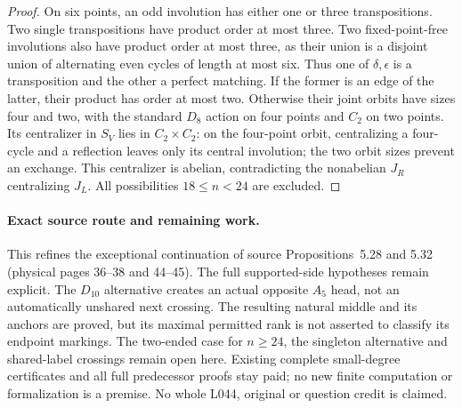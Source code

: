 \documentclass[11pt,a4paper]{article}
\begin{document}
\begin{proof}
On six points, an odd involution has either one or three
transpositions. Two single transpositions have product order at
most three. Two fixed-point-free involutions also have product
order at most three, as their union is a disjoint union of
alternating even cycles of length at most six.
Thus one of $\delta,\epsilon$ is a transposition and the other
a perfect matching. If the former is an edge of the latter,
their product has order at most two. Otherwise their joint orbits
have sizes four and two, with the standard $D_8$ action on four
points and $C_2$ on two points. Its centralizer in $S_V$ lies in
$C_2\times C_2$: on the four-point orbit, centralizing a
four-cycle and a reflection leaves only its central involution;
the two orbit sizes prevent an exchange. This centralizer is
abelian, contradicting the nonabelian $J_R$ centralizing $J_L$.
All possibilities $18\le n<24$ are excluded.
\end{proof}

\paragraph{Exact source route and remaining work.}
This refines the exceptional continuation of source
Propositions~5.28 and 5.32 (physical pages 36--38 and 44--45).
The full supported-side hypotheses remain explicit.
The $D_{10}$ alternative creates an actual opposite $A_5$ head,
not an automatically unshared next crossing. The resulting
natural middle and its anchors are proved, but its maximal
permitted rank is not asserted to classify its endpoint markings.
The two-ended case for $n\ge24$, the singleton alternative and
shared-label crossings remain open here. Existing complete
small-degree certificates and all full predecessor proofs stay
paid; no new finite computation or formalization is a premise.
No whole L044, original or question credit is claimed.
\end{document}
